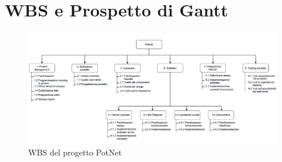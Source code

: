 \section{WBS e Prospetto di Gantt}

\begin{figure}[ht!]
	\centering
	\includegraphics[width=\textwidth]{./images/wbs.PNG} 
	\caption{WBS del progetto PotNet \label{overflow}}
\end{figure}